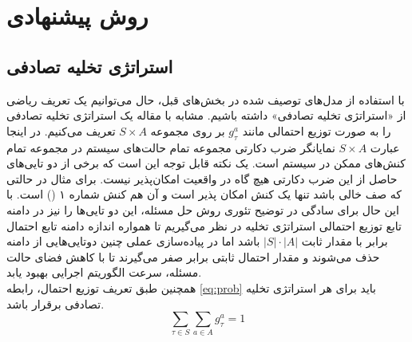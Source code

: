 \chapter{روش پیشنهادی}

\section{استراتژی تخلیه تصادفی}
با استفاده از مدل‌های توصیف شده در بخش‌های قبل، حال می‌توانیم یک تعریف ریاضی از «استراتژی تخلیه تصادفی» داشته باشیم. مشابه با مقاله \cite{Liu} یک استراتژی تخلیه تصادفی را به صورت توزیع احتمالی مانند \(g_\tau^a\) بر روی مجموعه \(S \times A\) تعریف می‌کنیم. در اینجا عبارت \(S \times A\) نمایانگر ضرب دکارتی مجموعه تمام حالت‌های سیستم در مجموعه تمام کنش‌های ممکن در سیستم است. یک نکته قابل توجه این است که برخی از دو تایی‌های حاصل از این ضرب دکارتی هیچ گاه در واقعیت امکان‌پذیر نیست. برای مثال در حالتی که صف خالی باشد تنها یک کنش امکان پذیر است و آن هم کنش شماره ۱ () است. با این حال برای سادگی در توضیح تئوری روش حل مسئله، این دو تایی‌ها را نیز در دامنه تابع توزیع احتمالی استراتژی تخلیه در نظر می‌گیریم تا همواره اندازه دامنه تابع احتمال برابر با مقدار ثابت \(|S| \cdot |A|\) باشد اما در پیاده‌سازی عملی چنین دوتایی‌هایی از دامنه حذف می‌شوند و مقدار احتمال ثابتی برابر صفر می‌گیرند تا با کاهش فضای حالت مسئله، سرعت الگوریتم اجرایی بهبود یابد. \\

همچنین طبق تعریف توزیع احتمال، رابطه \ref{eq:prob} باید برای هر استراتژی تخلیه تصادفی برقرار باشد.
\begin{equation}
	\label{eq:prob}
	\sum_{\tau \in S} \sum_{a \in A} g_{\tau}^{a}=1
\end{equation}

